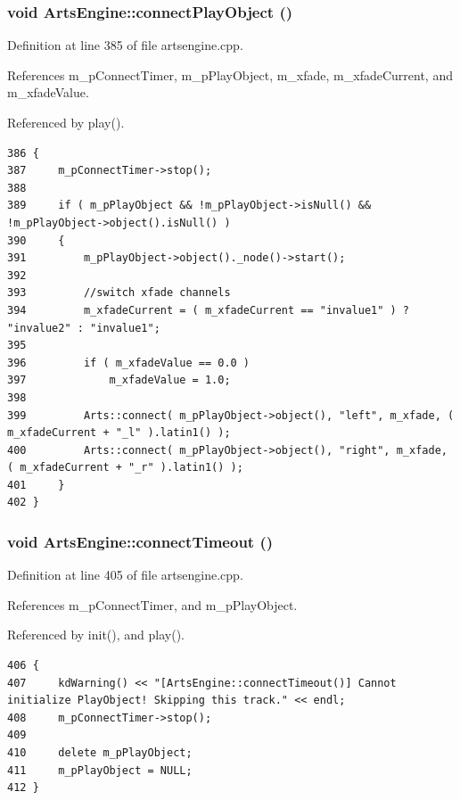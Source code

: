 \subsubsection{\setlength{\rightskip}{0pt plus 5cm}void Arts\-Engine::connect\-Play\-Object ()\hspace{0.3cm}{\tt  [private, slot]}}\label{classArtsEngine_ArtsEnginek0}




Definition at line 385 of file artsengine.cpp.

References m\_\-p\-Connect\-Timer, m\_\-p\-Play\-Object, m\_\-xfade, m\_\-xfade\-Current, and m\_\-xfade\-Value.

Referenced by play().



\footnotesize\begin{verbatim}386 {
387     m_pConnectTimer->stop();
388 
389     if ( m_pPlayObject && !m_pPlayObject->isNull() && !m_pPlayObject->object().isNull() )
390     {
391         m_pPlayObject->object()._node()->start();
392 
393         //switch xfade channels
394         m_xfadeCurrent = ( m_xfadeCurrent == "invalue1" ) ? "invalue2" : "invalue1";
395 
396         if ( m_xfadeValue == 0.0 )
397             m_xfadeValue = 1.0;
398 
399         Arts::connect( m_pPlayObject->object(), "left", m_xfade, ( m_xfadeCurrent + "_l" ).latin1() );
400         Arts::connect( m_pPlayObject->object(), "right", m_xfade, ( m_xfadeCurrent + "_r" ).latin1() );
401     }
402 }
\end{verbatim}\normalsize 
{}
\subsubsection{\setlength{\rightskip}{0pt plus 5cm}void Arts\-Engine::connect\-Timeout ()\hspace{0.3cm}{\tt  [private, slot]}}\label{classArtsEngine_ArtsEnginek1}




Definition at line 405 of file artsengine.cpp.

References m\_\-p\-Connect\-Timer, and m\_\-p\-Play\-Object.

Referenced by init(), and play().



\footnotesize\begin{verbatim}406 {
407     kdWarning() << "[ArtsEngine::connectTimeout()] Cannot initialize PlayObject! Skipping this track." << endl;
408     m_pConnectTimer->stop();
409 
410     delete m_pPlayObject;
411     m_pPlayObject = NULL;
412 }
\end{verbatim}\normalsize 
{}
